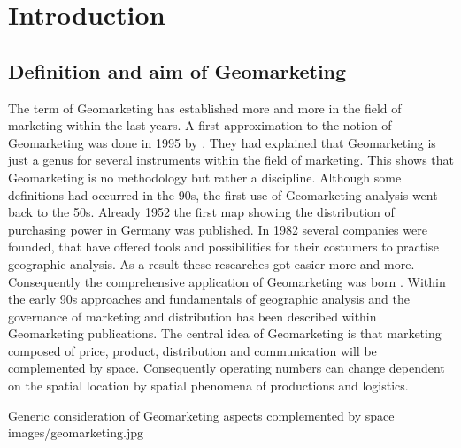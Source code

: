 \section{Introduction}

\subsection{Definition and aim of Geomarketing}
The term of Geomarketing has established more and more in the field of marketing within the last years.  A first approximation to the notion of Geomarketing was done in 1995 by \citeauthor{fruehling} \cite{fruehling}. They had explained that Geomarketing is just a genus for several instruments within the field of marketing. This shows that Geomarketing is no methodology but rather a discipline. Although some definitions had occurred in the 90s, the first use of Geomarketing analysis went back to the 50s. Already 1952 the first map showing the distribution of purchasing power in Germany was published. In 1982 several companies were founded, that have offered tools and possibilities for their costumers to practise geographic analysis. As a result these researches got easier more and more. Consequently the comprehensive application of Geomarketing was born \cite{herter}. Within the early 90s approaches and fundamentals of geographic analysis and the governance of marketing and distribution has been described within Geomarketing publications. The central idea of Geomarketing is that marketing composed of price, product, distribution and communication will be complemented by space. Consequently operating numbers can change dependent on the spatial location by spatial phenomena of productions and logistics.   


\begin{figureOwn}{Generic consideration of Geomarketing aspects complemented by space \cite{herter}}{images/geomarketing.jpg}\end{figureOwn}

